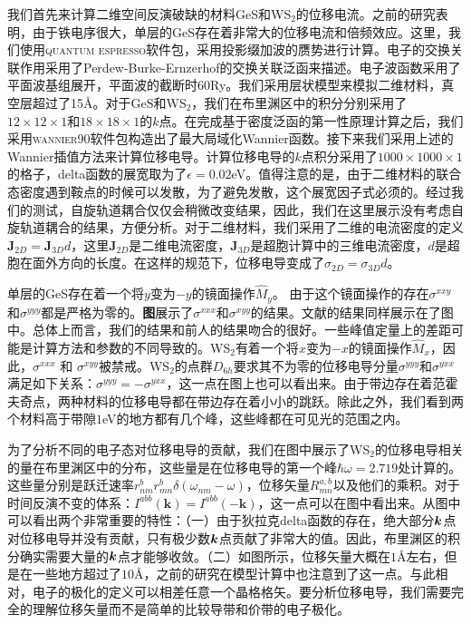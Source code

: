 我们首先来计算二维空间反演破缺的材料GeS和WS$_{2}$的位移电流。之前的研究表明，由于铁电序很大，单层的GeS存在着非常大的位移电流和倍频效应\cite{rangel_giant_2016,panday_strong_2017}。这里，我们使用\textsc{quantum espresso}软件包\cite{giannozzi_quantum_2009}，采用投影缀加波的赝势\cite{dal_corso_pseudopotentials_2014}进行计算。电子的交换关联作用采用了Perdew-Burke-Ernzerhof的交换关联泛函\cite{perdew_generalized_1996}来描述。电子波函数采用了平面波基组展开，平面波的截断时60Ry。我们采用层状模型来模拟二维材料，真空层超过了15\AA。对于GeS和WS$_2$，我们在布里渊区中的积分分别采用了 $12\times12\times1$和$18\times18\times1$的$k$点。在完成基于密度泛函的第一性原理计算之后，我们采用\textsc{wannier90}软件包\cite{mostofi_updated_2014}构造出了最大局域化Wannier函数。接下来我们采用上述的Wannier插值方法来计算位移电导。计算位移电导的$k$点积分采用了$1000\times1000\times1$的格子，delta函数的展宽取为了$\epsilon = 0.02$eV。值得注意的是，由于二维材料的联合态密度遇到鞍点的时候可以发散，为了避免发散，这个展宽因子式必须的。经过我们的测试，自旋轨道耦合仅仅会稍微改变结果，因此，我们在这里展示没有考虑自旋轨道耦合的结果，方便分析。对于二维材料，我们采用了二维的电流密度的定义$\mathbf{J}_{2D}=\mathbf{J}_{3D}d$，这里$\mathbf{J}_{2D}$是二维电流密度，$\mathbf{J}_{3D}$是超胞计算中的三维电流密度，$d$是超胞在面外方向的长度。在这样的规范下，位移电导变成了$\sigma_{2D}=\sigma_{3D}d$。


单层的GeS存在着一个将$y$变为$-y$的镜面操作$\hat{M}_{y}$。 由于这个镜面操作的存在$\sigma^{xxy}$和$\sigma^{yyy}$都是严格为零的。\textbf{图}展示了$\sigma^{xxx}$和$\sigma^{xyy}$的结果。文献的结果同样展示在了图中。总体上而言，我们的结果和前人的结果吻合的很好。一些峰值定量上的差距可能是计算方法和参数的不同导致的。WS$_2$有着一个将$x$变为$-x$的镜面操作$\hat{M}_{x}$，因此，$\sigma^{xxx}$ 和 $\sigma^{xyy}$被禁戒。WS$_2$的点群$D_{6h}$要求其不为零的位移电导分量$\sigma^{yyy}$和$\sigma^{yxx}$满足如下关系：$\sigma^{yyy}=-\sigma^{yxx}$，这一点在图上也可以看出来。由于带边存在着范霍夫奇点，两种材料的位移电导都在带边存在着小小的跳跃。除此之外，我们看到两个材料高于带隙$1$eV的地方都有几个峰，这些峰都在可见光的范围之内。

为了分析不同的电子态对位移电导的贡献，我们在图中展示了WS$_2$的位移电导相关的量在布里渊区中的分布，这些量是在位移电导的第一个峰$\hbar\omega = 2.719$处计算的。这些量分别是跃迁速率$r_{nm}^{b}r_{mn}^{b}\delta(\omega_{nm}-\omega)$，位移矢量$R_{mn}^{a,b}$以及他们的乘积。对于时间反演不变的体系：$I^{abb}(\mathbf{k})=I^{abb}(-\mathbf{k})$，这一点可以在图中看出来。从图中可以看出两个非常重要的特性：（一）由于狄拉克delta函数的存在，绝大部分$\boldsymbol{k}$点对位移电导并没有贡献，只有极少数$\boldsymbol{k}$点贡献了非常大的值。因此，布里渊区的积分确实需要大量的$\boldsymbol{k}$点才能够收敛。（二）如图所示，位移矢量大概在$1$\AA 左右，但是在一些地方超过了$10$\AA ，之前的研究\cite{fregoso_quantitative_2016}在模型计算中也注意到了这一点。与此相对，电子的极化的定义可以相差任意一个晶格格矢。要分析位移电导，我们需要完全的理解位移矢量而不是简单的比较导带和价带的电子极化\cite{young2012}。


